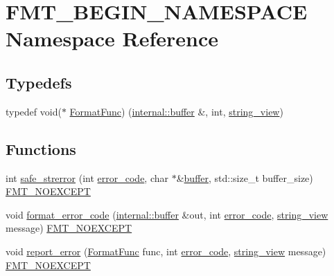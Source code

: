 \hypertarget{namespace_f_m_t___b_e_g_i_n___n_a_m_e_s_p_a_c_e}{}\section{F\+M\+T\+\_\+\+B\+E\+G\+I\+N\+\_\+\+N\+A\+M\+E\+S\+P\+A\+CE Namespace Reference}
\label{namespace_f_m_t___b_e_g_i_n___n_a_m_e_s_p_a_c_e}
\subsection*{Typedefs}
\begin{DoxyCompactItemize}
\item 
typedef void($\ast$ \hyperlink{namespace_f_m_t___b_e_g_i_n___n_a_m_e_s_p_a_c_e_a6da944ca5d9656fe12a5c1f629f665ff}{Format\+Func}) (\hyperlink{namespaceinternal_a5fcdbc3efad1f390e6c3f0fdafa56122}{internal\+::buffer} \&, int, \hyperlink{core_8h_a17e3ff7f9ac2b8f068f719b829890036}{string\+\_\+view})
\end{DoxyCompactItemize}
\subsection*{Functions}
\begin{DoxyCompactItemize}
\item 
int \hyperlink{namespace_f_m_t___b_e_g_i_n___n_a_m_e_s_p_a_c_e_a3770dc340d58166b701180e092935e12}{safe\+\_\+strerror} (int \hyperlink{classerror__code}{error\+\_\+code}, char $\ast$\&\hyperlink{printf_8h_ae986769e0053f875cd11c9fa4d22c8a8}{buffer}, std\+::size\+\_\+t buffer\+\_\+size) \hyperlink{core_8h_aef128913e8400683b1cbd1a3a2e11df3}{F\+M\+T\+\_\+\+N\+O\+E\+X\+C\+E\+PT}
\item 
void \hyperlink{namespace_f_m_t___b_e_g_i_n___n_a_m_e_s_p_a_c_e_ad71fe6b856abb34c3351b17daaaae709}{format\+\_\+error\+\_\+code} (\hyperlink{namespaceinternal_a5fcdbc3efad1f390e6c3f0fdafa56122}{internal\+::buffer} \&out, int \hyperlink{classerror__code}{error\+\_\+code}, \hyperlink{core_8h_a17e3ff7f9ac2b8f068f719b829890036}{string\+\_\+view} message) \hyperlink{core_8h_aef128913e8400683b1cbd1a3a2e11df3}{F\+M\+T\+\_\+\+N\+O\+E\+X\+C\+E\+PT}
\item 
void \hyperlink{namespace_f_m_t___b_e_g_i_n___n_a_m_e_s_p_a_c_e_a9a8134e5f6a1fb2e4fca1b8efdbb3927}{report\+\_\+error} (\hyperlink{namespace_f_m_t___b_e_g_i_n___n_a_m_e_s_p_a_c_e_a6da944ca5d9656fe12a5c1f629f665ff}{Format\+Func} func, int \hyperlink{classerror__code}{error\+\_\+code}, \hyperlink{core_8h_a17e3ff7f9ac2b8f068f719b829890036}{string\+\_\+view} message) \hyperlink{core_8h_aef128913e8400683b1cbd1a3a2e11df3}{F\+M\+T\+\_\+\+N\+O\+E\+X\+C\+E\+PT}
\end{DoxyCompactItemize}


